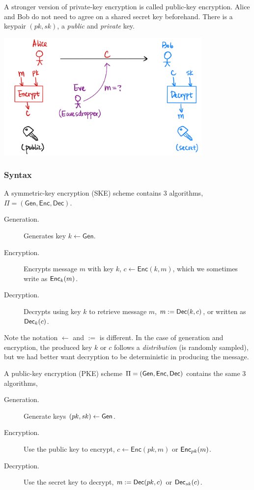 A stronger version of private-key encryption is called public-key encryption. Alice and Bob do not need to agree on a shared secret key beforehand. There is a keypair $(pk, sk)$, a \emph{public} and \emph{private} key.

\begin{center}
    \includegraphics[width=0.8\textwidth]{images/2023-01-31/pke-intro.png}
\end{center}

\subsubsection{Syntax}
\begin{definition}
    A symmetric-key encryption (SKE) scheme contains 3 algorithms, $\Pi = (\mathsf{Gen}, \mathsf{Enc}, \mathsf{Dec})$.

    \begin{description}
        \item[Generation.] Generates key $k\leftarrow \mathsf{Gen}$.
        \item[Encryption.] Encrypts message $m$ with key $k$, $c\leftarrow \mathsf{Enc}(k, m)$, which we sometimes write as $\operatorname{\mathsf{Enc}}_k(m)$.
        \item[Decryption.] Decrypts using key $k$ to retrieve message $m$, $m := \operatorname{\mathsf{Dec}}(k, c)$, or written as $\operatorname{\mathsf{Dec}}_k(c)$.
    \end{description}
    Note the notation $\leftarrow$ and $:=$ is different. In the case of generation and encryption, the produced key $k$ or $c$ follows a \emph{distribution} (is randomly sampled), but we had better want decryption to be deterministic in producing the message.
\end{definition}

\begin{definition}
    A public-key encryption (PKE) scheme $\Pi = (\operatorname{\mathsf{Gen}}, \operatorname{\mathsf{Enc}}, \operatorname{\mathsf{Dec}})$ contains the same $3$ algorithms,

    \begin{description}
        \item[Generation.] Generate keys $(pk, sk)\leftarrow \operatorname{\mathsf{Gen}}$.
        \item[Encryption.] Use the public key to encrypt, $c\leftarrow \mathsf{Enc}(pk, m)$ or $\operatorname{\mathsf{Enc}}_{pk}(m)$.
        \item[Decryption.] Use the secret key to decrypt, $m:=\operatorname{\mathsf{Dec}}(pk, c)$ or $\operatorname{\mathsf{Dec}}_{sk}(c)$.
    \end{description}

\end{definition}

